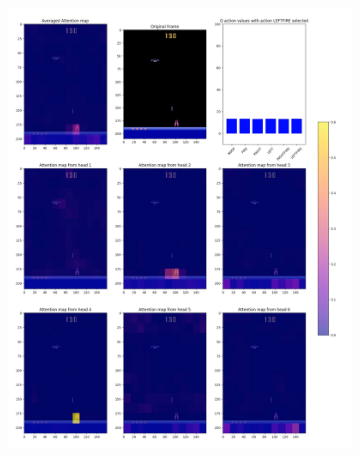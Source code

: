 \begin{figure}[htbp]
	\centering
	\begin{subfigure}{0.48\textwidth}
		\centering
		\includegraphics[width=\linewidth]{figures/demonattack_attn_maps}
		\caption{}
		\label{fig:demonattackattnmaps}
	\end{subfigure}
	\begin{subfigure}{0.48\textwidth}
		\centering

\end{subfigure}
\end{figure}

